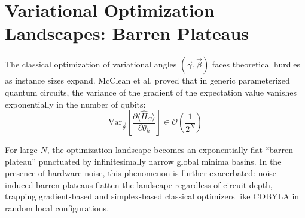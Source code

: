 \section{Variational Optimization Landscapes: Barren Plateaus}
The classical optimization of variational angles $(\vec{\gamma}, \vec{\beta})$ faces theoretical hurdles as instance sizes expand. McClean et al. \cite{mcclean2018barren} proved that in generic parameterized quantum circuits, the variance of the gradient of the expectation value vanishes exponentially in the number of qubits:
\begin{equation}
\text{Var}_{\vec{\theta}}\left[ \frac{\partial \langle \hat{H}_C \rangle}{\partial \theta_k} \right] \in \mathcal{O}\left( \frac{1}{2^N} \right)
\end{equation}

For large $N$, the optimization landscape becomes an exponentially flat ``barren plateau'' punctuated by infinitesimally narrow global minima basins. In the presence of hardware noise, this phenomenon is further exacerbated: noise-induced barren plateaus flatten the landscape regardless of circuit depth, trapping gradient-based and simplex-based classical optimizers like COBYLA in random local configurations.
